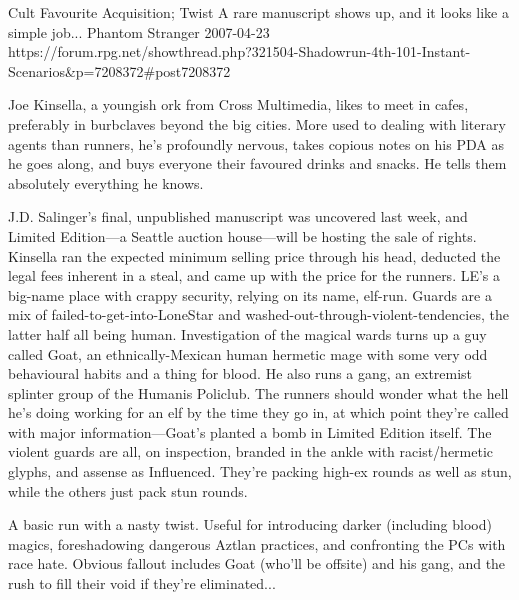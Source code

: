 \begin{scenario}{Cult Favourite}
	{Acquisition; Twist}
	{A rare manuscript shows up, and it looks like a simple job...}
	{Phantom Stranger}
	{2007-04-23}
	{https://forum.rpg.net/showthread.php?321504-Shadowrun-4th-101-Instant-Scenarios\&p=7208372#post7208372}

  Joe Kinsella, a youngish ork from Cross Multimedia, likes to meet in cafes, preferably in burbclaves beyond the big cities. More used to dealing with literary agents than runners, he's profoundly nervous, takes copious notes on his PDA as he goes along, and buys everyone their favoured drinks and snacks. He tells them absolutely everything he knows.

\synopsis J.D. Salinger's final, unpublished manuscript was uncovered last week, and Limited Edition---a Seattle auction house---will be hosting the sale of rights. Kinsella ran the expected minimum selling price through his head, deducted the legal fees inherent in a steal, and came up with the price for the runners. LE's a big-name place with crappy security, relying on its name, elf-run. Guards are a mix of failed-to-get-into-LoneStar and washed-out-through-violent-tendencies, the latter half all being human. Investigation of the magical wards turns up a guy called Goat, an ethnically-Mexican human hermetic mage with some very odd behavioural habits and a thing for blood. He also runs a gang, an extremist splinter group of the Humanis Policlub. The runners should wonder what the hell he's doing working for an elf by the time they go in, at which point they're called with major information---Goat's planted a bomb in Limited Edition itself. The violent guards are all, on inspection, branded in the ankle with racist/hermetic glyphs, and assense as Influenced. They're packing high-ex rounds as well as stun, while the others just pack stun rounds.

\notes A basic run with a nasty twist. Useful for introducing darker (including blood) magics, foreshadowing dangerous Aztlan practices, and confronting the PCs with race hate. Obvious fallout includes Goat (who'll be offsite) and his gang, and the rush to fill their void if they're eliminated...

\end{scenario}